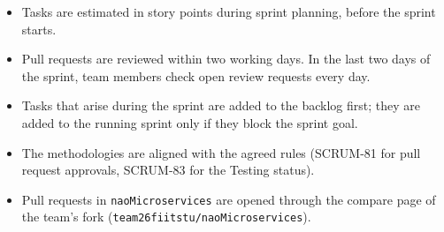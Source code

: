 \documentclass[12pt,a4paper]{article}
\begin{document}
\begin{itemize}
    \item Tasks are estimated in story points during sprint planning,
          before the sprint starts.
    \item Pull requests are reviewed within two working days. In the last
          two days of the sprint, team members check open review requests
          every day.
    \item Tasks that arise during the sprint are added to the backlog first;
          they are added to the running sprint only if they block the sprint
          goal.
    \item The methodologies are aligned with the agreed rules (SCRUM-81 for
          pull request approvals, SCRUM-83 for the Testing status).
    \item Pull requests in \texttt{naoMicroservices} are opened through the
          compare page of the team's fork
          (\texttt{team26fiitstu/naoMicroservices}).
\end{itemize}
\end{document}
